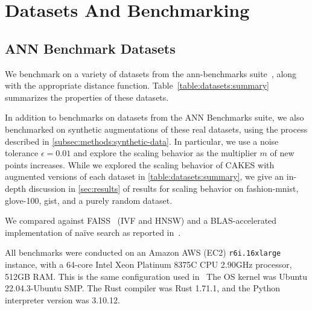 
\section{Datasets And Benchmarking}
\label{sec:datasets-and-benchmarks}

\subsection{ANN Benchmark Datasets}
\label{subsec:ann-benchmarks}


We benchmark on a variety of datasets from the ann-benchmarks suite~\cite{Aumller2018ANNBenchmarksAB}, along with the appropriate distance function.
Table~\ref{table:datasets:summary} summarizes the properties of these datasets.

In addition to benchmarks on datasets from the ANN Benchmarks suite, we also benchmarked on synthetic augmentations of these real datasets, using the process described in \ref{subsec:methods:synthetic-data}. In particular, we use a noise tolerance $\epsilon = 0.01$ and explore the scaling behavior as the multiplier $m$ of new points increases. While we explored the scaling behavior of CAKES with augmented versions of each dataset in \ref{table:datasets:summary}, we give an in-depth discussion in \ref{sec:results} of results for scaling behavior on fashion-mnist, glove-100, gist, and a purely random dataset. 

We compared against FAISS~\cite{johnson2019billion} (IVF and HNSW) and a BLAS-accelerated implementation of na\"ive search as reported in~\cite{johnson2019billion}.

All benchmarks were conducted on an Amazon AWS (EC2) \texttt{r6i.16xlarge} instance, with a 64-core Intel Xeon Platinum 8375C CPU 2.90GHz processor, 512GB RAM.
This is the same configuration used in~\cite{Aumller2018ANNBenchmarksAB}
The OS kernel was Ubuntu 22.04.3-Ubuntu SMP. 
The Rust compiler was Rust 1.71.1, and the Python interpreter version was 3.10.12.

